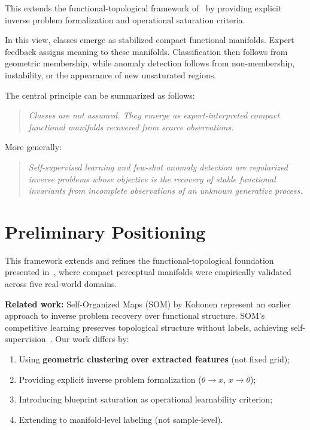 \documentclass[11pt,a4paper]{article}
\begin{document}
This extends the functional-topological framework of~\cite{diSanti2025Blueprints}
by providing explicit inverse problem formalization and operational saturation 
criteria.

In this view, classes emerge as stabilized compact functional manifolds. 
Expert feedback assigns meaning to these manifolds. Classification then follows 
from geometric membership, while anomaly detection follows from non-membership, 
instability, or the appearance of new unsaturated regions.

The central principle can be summarized as follows:

\begin{quote}
\emph{Classes are not assumed. They emerge as expert-interpreted compact 
functional manifolds recovered from scarce observations.}
\end{quote}

More generally:

\begin{quote}
\emph{Self-supervised learning and few-shot anomaly detection are regularized 
inverse problems whose objective is the recovery of stable functional invariants 
from incomplete observations of an unknown generative process.}
\end{quote}

\section{Preliminary Positioning}

This framework extends and refines the functional-topological foundation 
presented in~\cite{diSanti2025Blueprints}, where compact perceptual manifolds 
were empirically validated across five real-world domains.

\textbf{Related work:} Self-Organized Maps (SOM) by Kohonen\cite{kohonen1982som_original, kohonen1982som}
represent an earlier approach to inverse problem recovery over functional 
structure. SOM's competitive learning preserves topological structure without 
labels, achieving self-supervision~\cite{kohonen1982som}. Our work differs by:

\begin{enumerate}
    \item Using \textbf{geometric clustering over extracted features} (not fixed grid);
    \item Providing explicit inverse problem formalization ($\theta \to x$, $x \to \theta$);
    \item Introducing blueprint saturation as operational learnability criterion;
    \item Extending to manifold-level labeling (not sample-level).
\end{enumerate}
\end{document}
